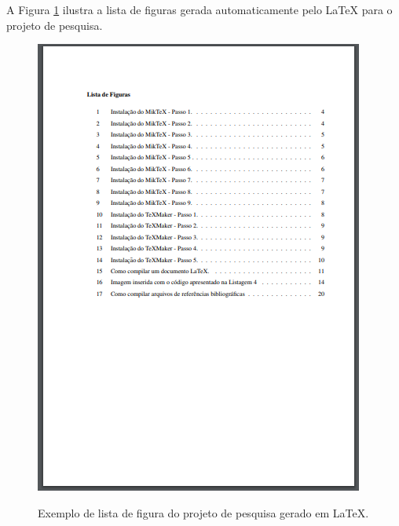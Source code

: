 \newpage
A Figura \ref{listafigProj} ilustra a lista de figuras gerada automaticamente pelo LaTeX para o projeto de pesquisa.\\
\begin{figure}[h]
	\centering
	\includegraphics{imagens/projetoPesq/ListaFig.png}\\
	\caption{Exemplo de lista de figura do projeto de pesquisa gerado em LaTeX.}
	\label{listafigProj}
\end{figure}

